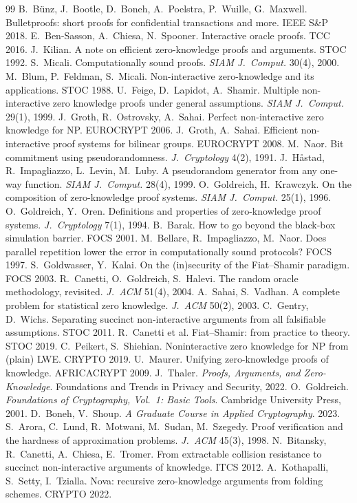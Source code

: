 \documentclass[11pt,a4paper]{report}
\theoremstyle{plain}
\theoremstyle{definition}
\theoremstyle{remark}
\begin{document}
\begin{thebibliography}{99}
 B.\ B\"unz, J.\ Bootle, D.\ Boneh, A.\ Poelstra, P.\ Wuille, G.\ Maxwell. Bulletproofs: short proofs for confidential transactions and more. IEEE S\&P 2018.
 E.\ Ben-Sasson, A.\ Chiesa, N.\ Spooner. Interactive oracle proofs. TCC 2016.
 J.\ Kilian. A note on efficient zero-knowledge proofs and arguments. STOC 1992.
 S.\ Micali. Computationally sound proofs. \emph{SIAM J.\ Comput.} 30(4), 2000.
 M.\ Blum, P.\ Feldman, S.\ Micali. Non-interactive zero-knowledge and its applications. STOC 1988.
 U.\ Feige, D.\ Lapidot, A.\ Shamir. Multiple non-interactive zero knowledge proofs under general assumptions. \emph{SIAM J.\ Comput.} 29(1), 1999.
 J.\ Groth, R.\ Ostrovsky, A.\ Sahai. Perfect non-interactive zero knowledge for NP. EUROCRYPT 2006.
 J.\ Groth, A.\ Sahai. Efficient non-interactive proof systems for bilinear groups. EUROCRYPT 2008.
 M.\ Naor. Bit commitment using pseudorandomness. \emph{J.\ Cryptology} 4(2), 1991.
 J.\ H{\aa}stad, R.\ Impagliazzo, L.\ Levin, M.\ Luby. A pseudorandom generator from any one-way function. \emph{SIAM J.\ Comput.} 28(4), 1999.
 O.\ Goldreich, H.\ Krawczyk. On the composition of zero-knowledge proof systems. \emph{SIAM J.\ Comput.} 25(1), 1996.
 O.\ Goldreich, Y.\ Oren. Definitions and properties of zero-knowledge proof systems. \emph{J.\ Cryptology} 7(1), 1994.
 B.\ Barak. How to go beyond the black-box simulation barrier. FOCS 2001.
 M.\ Bellare, R.\ Impagliazzo, M.\ Naor. Does parallel repetition lower the error in computationally sound protocols? FOCS 1997.
 S.\ Goldwasser, Y.\ Kalai. On the (in)security of the Fiat--Shamir paradigm. FOCS 2003.
 R.\ Canetti, O.\ Goldreich, S.\ Halevi. The random oracle methodology, revisited. \emph{J.\ ACM} 51(4), 2004.
 A.\ Sahai, S.\ Vadhan. A complete problem for statistical zero knowledge. \emph{J.\ ACM} 50(2), 2003.
 C.\ Gentry, D.\ Wichs. Separating succinct non-interactive arguments from all falsifiable assumptions. STOC 2011.
 R.\ Canetti et al. Fiat--Shamir: from practice to theory. STOC 2019.
 C.\ Peikert, S.\ Shiehian. Noninteractive zero knowledge for NP from (plain) LWE. CRYPTO 2019.
 U.\ Maurer. Unifying zero-knowledge proofs of knowledge. AFRICACRYPT 2009.
 J.\ Thaler. \emph{Proofs, Arguments, and Zero-Knowledge}. Foundations and Trends in Privacy and Security, 2022.
 O.\ Goldreich. \emph{Foundations of Cryptography, Vol.\ 1: Basic Tools}. Cambridge University Press, 2001.
 D.\ Boneh, V.\ Shoup. \emph{A Graduate Course in Applied Cryptography}. 2023.
 S.\ Arora, C.\ Lund, R.\ Motwani, M.\ Sudan, M.\ Szegedy. Proof verification and the hardness of approximation problems. \emph{J.\ ACM} 45(3), 1998.
 N.\ Bitansky, R.\ Canetti, A.\ Chiesa, E.\ Tromer. From extractable collision resistance to succinct non-interactive arguments of knowledge. ITCS 2012.
 A.\ Kothapalli, S.\ Setty, I.\ Tzialla. Nova: recursive zero-knowledge arguments from folding schemes. CRYPTO 2022.
\end{thebibliography}
\end{document}
